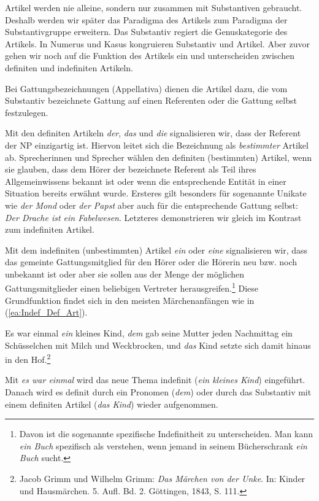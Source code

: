 Artikel werden nie alleine, sondern nur
zusammen mit Substantiven gebraucht. Deshalb werden wir später das Paradigma des Artikels zum Paradigma der Substantivgruppe erweitern. Das Substantiv regiert die Genuskategorie des Artikels. In Numerus und Kasus kongruieren Substantiv und Artikel. Aber zuvor gehen wir noch auf die Funktion des Artikels ein und unterscheiden zwischen definiten und indefiniten Artikeln.

Bei Gattungsbezeichnungen (Appellativa) dienen die Artikel dazu, die vom Substantiv bezeichnete Gattung auf einen Referenten oder die Gattung selbst festzulegen.

Mit den definiten Artikeln \textit{der}, \textit{das} und \textit{die} signalisieren wir, dass der Referent der NP einzigartig ist. Hiervon leitet sich die Bezeichnung als \textit{bestimmter} Artikel ab. Sprecherinnen und Sprecher wählen den definiten (bestimmten) Artikel, wenn sie glauben, dass dem Hörer der bezeichnete Referent als Teil ihres Allgemeinwissens bekannt ist oder wenn die entsprechende Entität in einer Situation bereits erwähnt wurde. Ersteres gilt besonders für sogenannte Unikate wie \textit{der Mond} oder \textit{der Papst} aber auch für die entsprechende Gattung selbst: \textit{Der Drache ist ein Fabelwesen}. Letzteres demonstrieren wir gleich im Kontrast zum indefiniten Artikel.

Mit dem indefiniten (unbestimmten) Artikel \textit{ein} oder \textit{eine} signalisieren wir, dass das gemeinte Gattungsmitglied für den Hörer oder die Hörerin neu bzw. noch unbekannt ist oder aber sie sollen aus der Menge der möglichen Gattungsmitglieder einen beliebigen Vertreter herausgreifen.\footnote{Davon ist die sogenannte spezifische Indefinitheit zu unterscheiden. Man kann \textit{ein Buch} spezifisch als  verstehen, \zB wenn jemand in seinem Bücherschrank \textit{ein Buch} sucht.} Diese Grundfunktion findet sich in den meisten Märchenanfängen wie in (\ref{ea:Indef_Def_Art}).


\ea \label{ea:Indef_Def_Art} Es war einmal \textit{ein} kleines Kind, \textit{dem} gab seine Mutter jeden Nachmittag ein Schüsselchen mit Milch und Weckbrocken, und \textit{das} Kind setzte sich damit hinaus in den Hof.\footnote{Jacob Grimm und Wilhelm Grimm: \textit{Das Märchen von der Unke}. In: Kinder und Hausmärchen. 5. Aufl. Bd. 2. Göttingen, 1843, S. 111.}
\z 

Mit \textit{es war einmal} wird das neue Thema indefinit (\textit{ein kleines Kind}) eingeführt. Danach wird es definit durch ein Pronomen (\textit{dem}) oder durch das Substantiv mit einem definiten Artikel (\textit{das Kind}) wieder aufgenommen.


